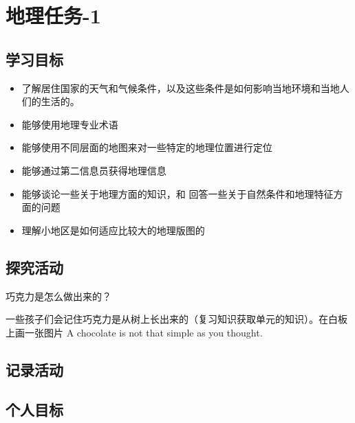 \chapter{地理任务-1}



\section{学习目标}
    \begin{itemize}
      \item 了解居住国家的天气和气候条件，以及这些条件是如何影响当地环境和当地人们的生活的。
      \item 能够使用地理专业术语
      \item 能够使用不同层面的地图来对一些特定的地理位置进行定位
      \item 能够通过第二信息员获得地理信息
      \item 能够谈论一些关于地理方面的知识，和 回答一些关于自然条件和地理特征方面的问题
      \item 理解小地区是如何适应比较大的地理版图的
    \end{itemize}  


\section{探究活动}
     巧克力是怎么做出来的？\par
     一些孩子们会记住巧克力是从树上长出来的（复习知识获取单元的知识）。在白板上画一张图片
     A chocolate is not that simple as you thought.
     


\section{记录活动}
   


\section{个人目标}
